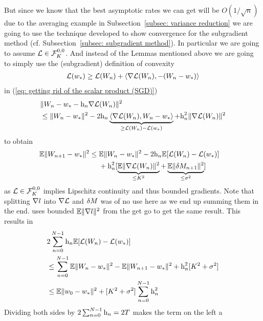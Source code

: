 But since we know that the best asymptotic rates we can get will be
\(O(1/\sqrt{n})\) due to the averaging example in Subsection~\ref{subsec:
variance reduction} we are going to use the technique developed to show
convergence for the subgradient method (cf. Subsection~\ref{subsec: subgradient
method}).
In particular we are going to assume \(\Loss \in
\lipGradientSet[0,0]{\lipConst}\). And instead of the Lemmas mentioned above we
are going to simply use the (subgradient)
definition of convexity
\begin{align*}
	\Loss(\minimum)
	\ge \Loss(\Weights_n) + 
	\langle\nabla\Loss(\Weights_n), -(\Weights_n - \minimum)\rangle
\end{align*}
in (\ref{eq: getting rid of the scalar product (SGD)})
\begin{align*}
	&\|\Weights_n - \minimum - \lr_n\nabla\Loss(\Weights_n)\|^2\\
	&\le \|\Weights_n - \minimum\|^2
	- 2\lr_n\underbrace{\langle\nabla\Loss(\Weights_n), \Weights_n-\minimum\rangle}_{
		\ge \Loss(\Weights_n) - \Loss(\minimum)
	}
	+ \lr_n^2 \|\nabla\Loss(\Weights_n)\|^2
\end{align*}
to obtain
\begin{align*}
	\E\|\Weights_{n+1}-\minimum\|^2
	&\le
	\begin{aligned}[t]
		&\E\|\Weights_n -\minimum\|^2
		- 2\lr_n \E[\Loss(\Weights_n) - \Loss(\minimum)]\\
		&+ \lr_n^2 [
			\underbrace{\E\|\nabla\Loss(\Weights_n)\|^2}_{\le \lipConst^2}
			+ \underbrace{\E\|\martIncr_{n+1}\|^2}_{\le \stdBound^2}
		]
	\end{aligned}
\end{align*}
as \(\Loss\in\lipGradientSet[0,0]{\lipConst}\) implies Lipschitz continuity and thus bounded
gradients. Note that splitting \(\nabla\loss\) into \(\nabla\Loss\) and \(\martIncr\)
was of no use here as we end up summing them in the end. \textcite{nemirovskiRobustStochasticApproximation2009}
uses bounded \(\E\|\nabla\loss\|^2\) from the get go to get the same result.
This results in
\begin{align*}
	&2\sum_{n=0}^{N-1} \lr_n\E[\Loss(\Weights_n)-\Loss(\minimum)]\\
	&\le \sum_{n=0}^{N-1} \E\|\Weights_n -\minimum\|^2 - \E\|\Weights_{n+1}-\minimum\|^2
	+ \lr_n^2 [\lipConst^2 + \stdBound^2]\\
	&\le \E\|\weights_0 - \minimum\|^2 + [\lipConst^2+\stdBound^2]\sum_{n=0}^{N-1} \lr_n^2
\end{align*}
Dividing both sides by \(2\sum_{n=0}^{N-1}\lr_n=2T\) makes the term on the left a
